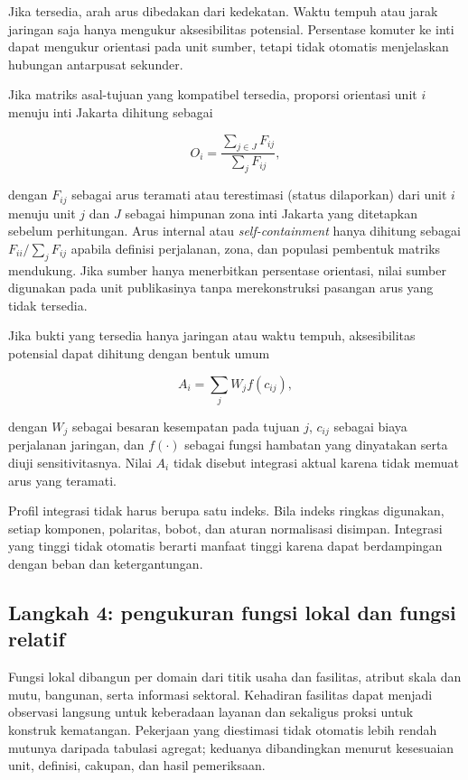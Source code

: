\documentclass[11pt,a4paper,oneside,openany,indonesian]{report}
\begin{document}
Jika tersedia, arah arus dibedakan dari kedekatan. Waktu tempuh atau
jarak jaringan saja hanya mengukur aksesibilitas potensial. Persentase
komuter ke inti dapat mengukur orientasi pada unit sumber, tetapi tidak
otomatis menjelaskan hubungan antarpusat sekunder.

Jika matriks asal-tujuan yang kompatibel tersedia, proporsi orientasi
unit \(i\) menuju inti Jakarta dihitung sebagai

\[
O_i = \frac{\sum_{j \in J} F_{ij}}{\sum_j F_{ij}},
\]

dengan \(F_{ij}\) sebagai arus teramati atau terestimasi (status
dilaporkan) dari unit \(i\) menuju unit \(j\) dan \(J\) sebagai himpunan
zona inti Jakarta yang ditetapkan sebelum perhitungan. Arus internal
atau \emph{self-containment} hanya dihitung sebagai
\(F_{ii}/\sum_j F_{ij}\) apabila definisi perjalanan, zona, dan populasi
pembentuk matriks mendukung. Jika sumber hanya menerbitkan persentase
orientasi, nilai sumber digunakan pada unit publikasinya tanpa
merekonstruksi pasangan arus yang tidak tersedia.

Jika bukti yang tersedia hanya jaringan atau waktu tempuh, aksesibilitas
potensial dapat dihitung dengan bentuk umum

\[
A_i = \sum_j W_j f(c_{ij}),
\]

dengan \(W_j\) sebagai besaran kesempatan pada tujuan \(j\), \(c_{ij}\)
sebagai biaya perjalanan jaringan, dan \(f(\cdot)\) sebagai fungsi
hambatan yang dinyatakan serta diuji sensitivitasnya. Nilai \(A_i\)
tidak disebut integrasi aktual karena tidak memuat arus yang teramati.

Profil integrasi tidak harus berupa satu indeks. Bila indeks ringkas
digunakan, setiap komponen, polaritas, bobot, dan aturan normalisasi
disimpan. Integrasi yang tinggi tidak otomatis berarti manfaat tinggi
karena dapat berdampingan dengan beban dan ketergantungan.

\subsection{Langkah 4: pengukuran fungsi lokal dan fungsi
relatif}\label{langkah-4-pengukuran-fungsi-lokal-dan-fungsi-relatif}

Fungsi lokal dibangun per domain dari titik usaha dan fasilitas, atribut
skala dan mutu, bangunan, serta informasi sektoral. Kehadiran fasilitas
dapat menjadi observasi langsung untuk keberadaan layanan dan sekaligus
proksi untuk konstruk kematangan. Pekerjaan yang diestimasi tidak
otomatis lebih rendah mutunya daripada tabulasi agregat; keduanya
dibandingkan menurut kesesuaian unit, definisi, cakupan, dan hasil
pemeriksaan.
\end{document}
